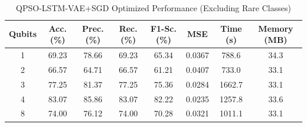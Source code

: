
\begin{table}[htbp]
\centering
\caption{QPSO-LSTM-VAE+SGD Optimized Performance (Excluding Rare Classes)}
\label{tab:qubit_ablation_optimized}
\begin{tabular}{|c|c|c|c|c|c|c|c|}
\hline
\textbf{Qubits} & \textbf{Acc. (\%)} & \textbf{Prec. (\%)} & \textbf{Rec. (\%)} & \textbf{F1-Sc. (\%)} & \textbf{MSE} & \textbf{Time (s)} & \textbf{Memory (MB)} \\
\hline
1 & 69.23 & 78.66 & 69.23 & 65.34 & 0.0367 & 788.6 & 34.3 \\
2 & 66.57 & 64.71 & 66.57 & 61.21 & 0.0407 & 733.0 & 33.1 \\
3 & 77.25 & 81.37 & 77.25 & 75.36 & 0.0284 & 1662.7 & 33.1 \\
4 & 83.07 & 85.86 & 83.07 & 82.22 & 0.0235 & 1257.8 & 33.6 \\
8 & 74.00 & 76.12 & 74.00 & 70.28 & 0.0321 & 1011.1 & 33.1 \\
\hline
\end{tabular}
\end{table}
